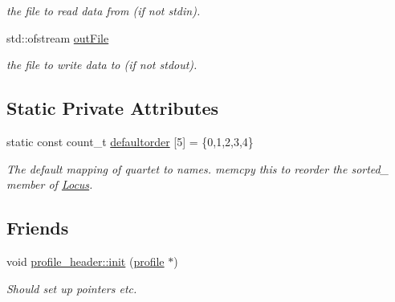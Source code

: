 \begin{DoxyCompactItemize}
\begin{DoxyCompactList}\small\item\em the file to read data from (if not stdin). \end{DoxyCompactList}\item 
\hypertarget{classprofile_af5d104b8be888df770d66f06200bfd04}{std\-::ofstream \hyperlink{classprofile_af5d104b8be888df770d66f06200bfd04}{out\-File}}\label{classprofile_af5d104b8be888df770d66f06200bfd04}

\begin{DoxyCompactList}\small\item\em the file to write data to (if not stdout). \end{DoxyCompactList}\end{DoxyCompactItemize}
\subsection*{Static Private Attributes}
\begin{DoxyCompactItemize}
\item 
\hypertarget{classprofile_a9e8c731e703d2962423146da4ca40d12}{static const count\-\_\-t \hyperlink{classprofile_a9e8c731e703d2962423146da4ca40d12}{defaultorder} \mbox{[}5\mbox{]} = \{0,1,2,3,4\}}\label{classprofile_a9e8c731e703d2962423146da4ca40d12}

\begin{DoxyCompactList}\small\item\em The default mapping of quartet to names. memcpy this to reorder the sorted\-\_\- member of \hyperlink{classLocus}{Locus}. \end{DoxyCompactList}\end{DoxyCompactItemize}
\subsection*{Friends}
\begin{DoxyCompactItemize}
\item 
\hypertarget{classprofile_a0cb442b2b4871225903533e34adec148}{void \hyperlink{classprofile_a0cb442b2b4871225903533e34adec148}{profile\-\_\-header\-::init} (\hyperlink{classprofile}{profile} $\ast$)}\label{classprofile_a0cb442b2b4871225903533e34adec148}

\begin{DoxyCompactList}\small\item\em Should set up pointers etc. \end{DoxyCompactList}\end{DoxyCompactItemize}


